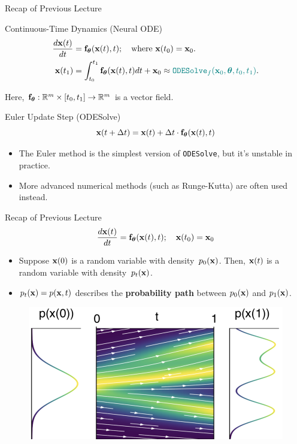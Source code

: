 \documentclass{beamer}
\begin{document}
\begin{frame}{Recap of Previous Lecture}
	\begin{block}{Continuous-Time Dynamics (Neural ODE)}
		\vspace{-0.5cm}
		\begin{align*}
			\frac{d \mathbf{x}(t)}{dt} &= \mathbf{f}_{\boldsymbol{\theta}}(\mathbf{x}(t), t);\quad \text{where } \mathbf{x}(t_0) = \mathbf{x}_0. \\
			\mathbf{x}(t_1) &= \int^{t_1}_{t_0} \mathbf{f}_{\boldsymbol{\theta}}(\mathbf{x}(t), t) d t  + \mathbf{x}_0 \approx {\color{teal}\texttt{ODESolve}_f(\mathbf{x}_0, \boldsymbol{\theta}, t_0, t_1)}.
		\end{align*}
		\vspace{-0.5cm}
	\end{block}
	Here, $\mathbf{f}_{\boldsymbol{\theta}}: \mathbb{R}^m \times [t_0, t_1] \rightarrow \mathbb{R}^m$ is a vector field.
	\begin{block}{Euler Update Step (ODESolve)}
		\vspace{-0.3cm}
		\[
  			\mathbf{x}(t + \Delta t) = \mathbf{x}(t) + \Delta t \cdot \mathbf{f}_{\boldsymbol{\theta}}(\mathbf{x}(t), t)
		\]
	\end{block}
	\begin{itemize}
		\item The Euler method is the simplest version of \texttt{ODESolve}, but it's unstable in practice.
		\item More advanced numerical methods (such as Runge-Kutta) are often used instead.
	\end{itemize}
\end{frame}
\begin{frame}{Recap of Previous Lecture}
	\vspace{-0.3cm}
	\[
 		\frac{d \mathbf{x}(t)}{dt} = \mathbf{f}_{\boldsymbol{\theta}}(\mathbf{x}(t), t);\quad \mathbf{x}(t_0) = \mathbf{x}_0
	\]
	\vspace{-0.3cm}
	\begin{itemize}
		\item Suppose $\mathbf{x}(0)$ is a random variable with density~$p_0(\mathbf{x})$. Then, $\mathbf{x}(t)$ is a random variable with density~$p_t(\mathbf{x})$.
		\item $p_t(\mathbf{x}) = p(\mathbf{x}, t)$ describes the \textbf{probability path} between $p_0(\mathbf{x})$ and $p_1(\mathbf{x})$.
	\end{itemize}
	\vspace{-0.3cm}
	\begin{figure}
		\centering
		\includegraphics[width=0.7\linewidth]{figs/cnf_flow.png}
	\end{figure}
\end{frame}
\end{document}

